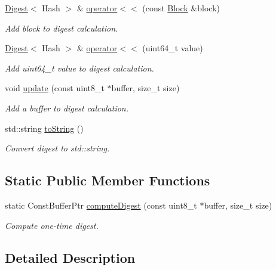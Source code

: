 \begin{DoxyCompactItemize}
\hyperlink{classndn_1_1util_1_1Digest}{Digest}$<$ Hash $>$ \& \hyperlink{classndn_1_1util_1_1Digest_a425ece0f5f891be90cbebc68519c848d}{operator$<$$<$} (const \hyperlink{classndn_1_1Block}{Block} \&block)
\begin{DoxyCompactList}\small\item\em Add block to digest calculation. \end{DoxyCompactList}\item 
\hyperlink{classndn_1_1util_1_1Digest}{Digest}$<$ Hash $>$ \& \hyperlink{classndn_1_1util_1_1Digest_a0fefd3d8e6baf30e767977f426316aa3}{operator$<$$<$} (uint64\+\_\+t value)
\begin{DoxyCompactList}\small\item\em Add uint64\+\_\+t value to digest calculation. \end{DoxyCompactList}\item 
void \hyperlink{classndn_1_1util_1_1Digest_a93c5278069cba589cf6436b66dba5942}{update} (const uint8\+\_\+t $\ast$buffer, size\+\_\+t size)
\begin{DoxyCompactList}\small\item\em Add a buffer to digest calculation. \end{DoxyCompactList}\item 
std\+::string \hyperlink{classndn_1_1util_1_1Digest_a87984295371dfc27e712c8aac0013b0b}{to\+String} ()
\begin{DoxyCompactList}\small\item\em Convert digest to std\+::string. \end{DoxyCompactList}\end{DoxyCompactItemize}
\subsection*{Static Public Member Functions}
\begin{DoxyCompactItemize}
\item 
static Const\+Buffer\+Ptr \hyperlink{classndn_1_1util_1_1Digest_a264d27d1a4189335be91ec701cebe895}{compute\+Digest} (const uint8\+\_\+t $\ast$buffer, size\+\_\+t size)
\begin{DoxyCompactList}\small\item\em Compute one-\/time digest. \end{DoxyCompactList}\end{DoxyCompactItemize}


\subsection{Detailed Description}
